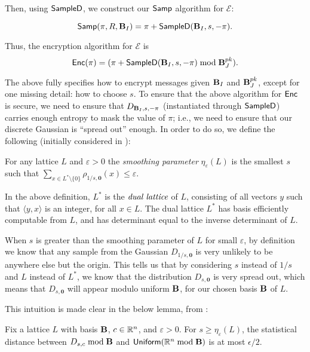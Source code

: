     Then, using ${\sf SampleD}$, we construct our ${\sf Samp}$ algorithm for $\mathcal{E}$:

    \[ {\sf Samp}(\pi, R, \textbf{B}_I) = \pi + {\sf SampleD}(\textbf{B}_I, s, - \pi).\]

    Thus, the encryption algorithm for $\mathcal{E}$ is
    \[ {\sf Enc}(\pi) = (\pi + {\sf SampleD}(\textbf{B}_I, s, -\pi) \bmod \textbf{B}_J^{pk}).\]

    The above fully specifies how to encrypt messages given $\textbf{B}_I$ and $\textbf{B}_J^{pk}$, except for one missing detail: how to choose $s$. To ensure that the above algorithm for ${\sf Enc}$ is secure, we need to ensure that $D_{\textbf{B}_I, s, -\pi}$ (instantiated through ${\sf SampleD}$) carries enough entropy to mask the value of $\pi$; i.e., we need to ensure that our discrete Gaussian is ``spread out'' enough. In order to do so, we define the following (initially considered in \cite{smoothing}):

    \begin{definition}
        For any lattice $L$ and $\varepsilon > 0$ the \emph{smoothing parameter} $\eta_\varepsilon (L)$ is the smallest $s$ such that $\sum_{x \in L^* \setminus \{0\}}\rho_{1/s, \mathbf{0}}(x) \leq \varepsilon$.
    \end{definition}

    In the above definition, $L^*$ is the $\emph{dual lattice}$ of $L$, consisting of all vectors $y$ such that $\langle y, x \rangle$ is an integer, for all $x \in L$. The dual lattice $L^*$ has basis efficiently computable from $L$, and has determinant equal to the inverse determinant of $L$.

    When $s$ is greater than the smoothing parameter of $L$ for small $\varepsilon$, by definition we know that any sample from the Gaussian $D_{1/s, \mathbf{0}}$ is very unlikely to be anywhere else but the origin. This tells us that by considering $s$ instead of $1/s$ and $L$ instead of $L^*$, we know that the distribution $D_{s, \mathbf{0}}$ is very spread out, which means that $D_{s, \mathbf{0}}$ will appear modulo uniform $\textbf{B}$, for our chosen basis $\textbf{B}$ of $L$.

    This intuition is made clear in the below lemma, from \cite{smoothing}:
    \begin{lemma}
        Fix a lattice $L$ with basis $\textbf{B}$, $c \in \mathbb{R}^n$, and $\varepsilon > 0$. For $s \geq \eta_\varepsilon (L)$, the statistical distance between $D_{s, c} \bmod \textbf{B}$ and ${\sf Uniform}(\mathbb{R}^n \bmod \textbf{B})$ is at most $\epsilon / 2$.
    \end{lemma}

